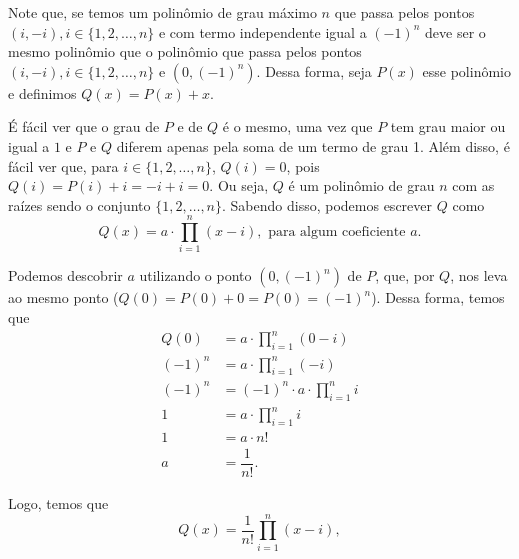 \documentclass{article}
\begin{document}
\begin{comment}
Mas note que $\begin{bmatrix}x & P(x) \end{bmatrix}\cdot R = \begin{bmatrix}x\frac{\sqrt{2}}{2} - P(x)\frac{\sqrt{2}}{2} & x\frac{\sqrt{2}}{2} + P(x)\frac{\sqrt{2}}{2}\end{bmatrix} = \begin{bmatrix}x_R & P_R(x_R)\end{bmatrix}$. Ou seja, para cada ponto $(x_R, P_R(x_R))$ que tomamos, podemos ver que, no plano cartesiano, esse ponto corresponde ao ponto $\left(\frac{x_R + P_R(x_R)}{\sqrt{2}}, \frac{P_R(x_R) - x_R}{\sqrt{2}}\right) = (x, P(x))$.
\end{comment}

Note que, se temos um polinômio de grau máximo $n$ que passa pelos pontos $(i, -i), i\in \{1, 2, \dots, n\}$ e com termo independente igual a $(-1)^n$ deve ser o mesmo polinômio que o polinômio que passa pelos pontos $(i, -i), i\in \{1, 2, \dots, n\}$ e $(0, (-1)^n)$. Dessa forma, seja $P(x)$ esse polinômio e definimos $Q(x) = P(x) + x$.

É fácil ver que o grau de $P$ e de $Q$ é o mesmo, uma vez que $P$ tem grau maior ou igual a $1$ e $P$ e $Q$ diferem apenas pela soma de um termo de grau 1. Além disso, é fácil ver que, para $i\in \{1, 2, \dots, n\}$, $Q(i) = 0$, pois $Q(i) = P(i) + i = - i + i = 0$. Ou seja, $Q$ é um polinômio de grau $n$ com as raízes sendo o conjunto $\{1, 2, \dots, n\}$. Sabendo disso, podemos escrever $Q$ como
\[Q(x) = a\cdot \prod_{i = 1}^{n} (x - i), \text{ para algum coeficiente } a.\]

Podemos descobrir $a$ utilizando o ponto $(0, (-1)^n)$ de $P$, que, por $Q$, nos leva ao mesmo ponto ($Q(0) = P(0) + 0 = P(0) = (-1)^n$). Dessa forma, temos que
\begin{equation*}
    \begin{split}
        Q(0) & = a\cdot \prod_{i = 1}^{n} (0 - i) \\
        (-1)^n & = a\cdot \prod_{i = 1}^{n} (- i) \\
        (-1)^n & = (-1)^n\cdot a\cdot \prod_{i = 1}^{n} i \\
        1 & = a\cdot \prod_{i = 1}^{n} i \\
        1 & = a\cdot n! \\
        a & = \dfrac{1}{n!}.
    \end{split}
\end{equation*}

Logo, temos que
\[Q(x) = \dfrac{1}{n!}\prod_{i = 1}^{n} (x - i),\]
\end{document}
